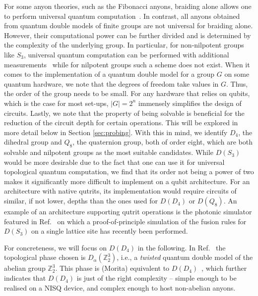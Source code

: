 \documentclass[a4paper,twocolumn,11pt, accepted=2024-06-14]{quantumarticle}
\begin{document}
For some anyon theories, such as the Fibonacci anyons, braiding alone allows one to perform universal quantum computation~\cite{Freedman2002}. In contrast, all anyons obtained from quantum double models of finite groups are not universal for braiding alone. However, their computational power can be further divided and is determined by the complexity of the underlying group. In particular, for non-nilpotent groups like $S_3$, universal quantum computation can be performed with additional measurements~\cite{Mochon2004} while for nilpotent groups such a scheme does not exist. 
When it comes to the implementation of a quantum double model for a group $G$ on some quantum hardware, we note that the degrees of freedom take values in $G$. Thus, the order of the group needs to be small. For any hardware that relies on qubits, which is the case for most set-ups, $|G|=2^n$ immensely simplifies the design of circuits. Lastly, we note that the property of being solvable is beneficial for the reduction of the circuit depth for certain operations. This will be explored in more detail below in Section \ref{sec:probing}. 
With this in mind, we identify $D_4$, the dihedral group and $Q_8$, the quaternion group, both of order eight, which are both solvable and nilpotent groups as the most suitable candidates.
While $D(S_3)$ would be more desirable due to the fact that one can use it for universal topological quantum computation, we find that its order not being a power of two makes it significantly more difficult to implement on a qubit architecture. For an architecture with native qutrits, its implementation would require circuits of similar, if not lower, depths than the ones used for $D(D_4)$ or $D(Q_8)$. An example of an architecture supporting qutrit operations is the photonic simulator featured in Ref.~\cite{goel2023unveiling} on which a proof-of-principle simulation of the fusion rules for $D(S_3)$ on a single lattice site has recently been performed. 

For concreteness, we will focus on $D(D_4)$ in the following. In Ref.~\cite{iqbal2023creation} the topological phase chosen is $D_\alpha(\mathbb Z_2^3)$, i.e., a \emph{twisted} quantum double model of the abelian group $\mathbb Z_2^3$. This phase is (Morita) equivalent to $D(D_4)$~\cite{mapping, propitius1995topological}, which further indicates that $D(D_4)$ is just of the right complexity -- simple enough to be realised on a NISQ device, and complex enough to host non-abelian anyons.
\end{document}
